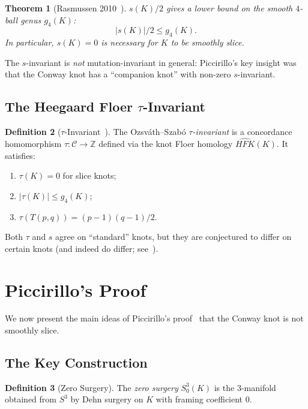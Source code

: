 \documentclass[12pt,a4paper]{amsart}
\newtheorem{theorem}{Theorem}[section]
\theoremstyle{definition}
\newtheorem{definition}[theorem]{Definition}
\theoremstyle{remark}
\newcommand{\Z}{\mathbb{Z}}
\begin{document}
\begin{theorem}[Rasmussen 2010~\cite{Rasmussen2010}]
$s(K)/2$ gives a lower bound on the smooth $4$-ball genus $g_4(K)$:
\[
    |s(K)|/2 \leq g_4(K).
\]
In particular, $s(K) = 0$ is necessary for $K$ to be smoothly slice.
\end{theorem}

The $s$-invariant is \emph{not} mutation-invariant in general:
Piccirillo's key insight was that the Conway knot has a ``companion knot''
with non-zero $s$-invariant.

\subsection{The Heegaard Floer \texorpdfstring{$\tau$}{tau}-Invariant}

\begin{definition}[$\tau$-Invariant~\cite{OzsvathSzabo2003}]
The Ozsváth--Szabó \emph{$\tau$-invariant} is a concordance homomorphism
$\tau \colon \mathcal{C} \to \Z$ defined via the knot Floer homology
$\widehat{HFK}(K)$. It satisfies:
\begin{enumerate}[label=\roman*)]
\item $\tau(K) = 0$ for slice knots;
\item $|\tau(K)| \leq g_4(K)$;
\item $\tau(T(p,q)) = (p-1)(q-1)/2$.
\end{enumerate}
\end{definition}

Both $\tau$ and $s$ agree on ``standard'' knots, but they are conjectured
to differ on certain knots (and indeed do differ; see~\cite{Hedden2009}).

\section{Piccirillo's Proof}

We now present the main ideas of Piccirillo's proof~\cite{Piccirillo2020}
that the Conway knot is not smoothly slice.

\subsection{The Key Construction}

\begin{definition}[Zero Surgery]
The \emph{zero surgery} $S^3_0(K)$ is the 3-manifold obtained from $S^3$
by Dehn surgery on $K$ with framing coefficient 0.
\end{definition}
\end{document}
